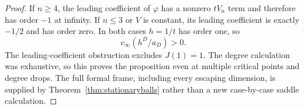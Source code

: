 \begin{proof}
If $n\geq4$, the leading coefficient of $\varphi$ has a nonzero
$tV_n$ term and therefore has order $-1$ at infinity. If $n\leq3$
or $V$ is constant, its leading coefficient is exactly $-1/2$ and
has order zero. In both cases $h=1/t$ has order one, so
\[
 v_\infty(h^D/a_D)>0.
\]
The leading-coefficient obstruction excludes $J(1)=1$. The degree
calculation was exhaustive, so this proves the proposition even at
multiple critical points and degree drops. The full formal frame,
including every escaping dimension, is supplied by
Theorem~\ref{thm:stationaryballs} rather than a new case-by-case
saddle calculation.
\end{proof}
